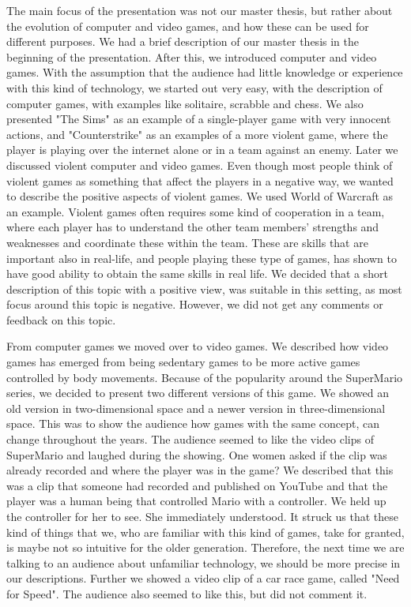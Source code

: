 The main focus of the presentation was not our master thesis, but rather about the evolution of computer and video games, and how these can be used for different purposes. We had a brief description of our master thesis in the beginning of the presentation. After this, we introduced computer and video games. With the assumption that the audience had little knowledge or experience with this kind of technology, we started out very easy, with the description of computer games, with examples like solitaire, scrabble and chess. We also presented "The Sims" as an example of a single-player game with very innocent actions, and "Counterstrike" as an examples of a more violent game, where the player is playing over the internet alone or in a team against an enemy. Later we discussed violent computer and video games. Even though most people think of violent games as something that affect the players in a negative way, we wanted to describe the positive aspects of violent games. We used World of Warcraft as an example. Violent games often requires some kind of cooperation in a team, where each player has to understand the other team members' strengths and weaknesses and coordinate these within the team. These are skills that are important also in real-life, and people playing these type of games, has shown to have good ability to obtain the same skills in real life. We decided that a short description of this topic with a positive view, was suitable in this setting, as most focus around this topic is negative. However, we did not get any comments or feedback on this topic. 

From computer games we moved over to video games. We described how video games has emerged from being sedentary games to be more active games controlled by body movements. Because of the popularity around the SuperMario series, we decided to present two different versions of this game. We showed an old version in two-dimensional space and a newer version in three-dimensional space. This was to show the audience how games with the same concept, can change throughout the years. The audience seemed to like the video clips of SuperMario and laughed during the showing. One women asked if the clip was already recorded and where the player was in the game? We described that this was a clip that someone had recorded and published on YouTube and that the player was a human being that controlled Mario with a controller. We held up the controller for her to see. She immediately understood. It struck us that these kind of things that we, who are familiar with this kind of games, take for granted, is maybe not so intuitive for the older generation. Therefore, the next time we are talking to an audience about unfamiliar technology, we should be more precise in our descriptions. Further we showed a video clip of a car race game, called "Need for Speed". The audience also seemed to like this, but did not comment it. 

